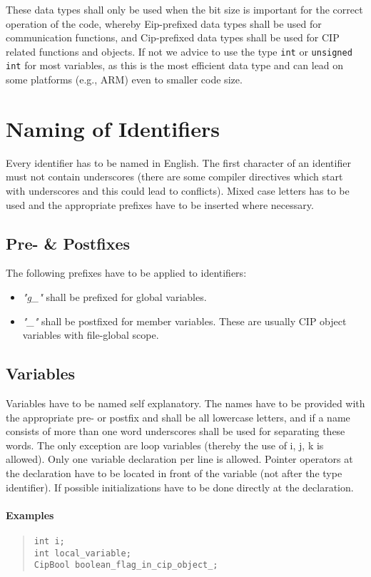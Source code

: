 \documentclass[final,a4paper,10pt, oneside]{article}
\begin{document}
These data types shall only be used when the bit size is important for the correct operation of the code, whereby Eip-prefixed data types shall be used for communication functions, and Cip-prefixed data types shall be used for CIP related functions and objects. If not we advice to use the type \verb|int| or \verb|unsigned int| for most variables, as this is the most efficient data type and can lead on some platforms (e.g., ARM) even to smaller code size.

\section{Naming of Identifiers}
Every identifier has to be named in English. The first character of an identifier must not contain underscores (there are some compiler directives which start with underscores and this could lead to conflicts). Mixed case letters has to be used and the appropriate prefixes have to be inserted where necessary.

\subsection{Pre- \& Postfixes}
The following prefixes have to be applied to identifiers:\\
\begin{itemize}
    \item \emph{"g\_"} shall be prefixed for global variables.
    \item \emph{"\_"} shall be postfixed for member variables. These are usually CIP object variables with file-global scope.
\end{itemize}

\subsection{Variables}
Variables have to be named self explanatory. The names have to be provided with the appropriate pre- or postfix and shall be all lowercase letters, and if a name consists of more than one word underscores shall be used for separating these words. The only exception are loop variables (thereby the use of i, j, k is allowed). Only one variable declaration per line is allowed. Pointer operators at the declaration have to be located in front of the variable (not after the type identifier). If possible initializations have to be done directly at the declaration.

\paragraph{Examples}
\begin{quote}
\begin{lstlisting}
int i;
int local_variable;
CipBool boolean_flag_in_cip_object_;
\end{lstlisting}
\end{quote}
\end{document}
